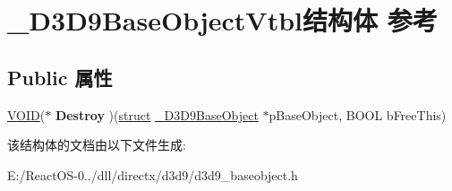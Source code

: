 \hypertarget{struct___d3_d9_base_object_vtbl}{}\section{\+\_\+\+D3\+D9\+Base\+Object\+Vtbl结构体 参考}
\label{struct___d3_d9_base_object_vtbl}
\subsection*{Public 属性}
\begin{DoxyCompactItemize}
\item 
\mbox{\label{struct___d3_d9_base_object_vtbl_a373ad3f5142ca0a7525a47ff6981341d}} 
\hyperlink{interfacevoid}{V\+O\+ID}($\ast$ {\bfseries Destroy} )(\hyperlink{interfacestruct}{struct} \hyperlink{struct___d3_d9_base_object}{\+\_\+\+D3\+D9\+Base\+Object} $\ast$p\+Base\+Object, B\+O\+OL b\+Free\+This)
\end{DoxyCompactItemize}


该结构体的文档由以下文件生成\+:\begin{DoxyCompactItemize}
\item 
E\+:/\+React\+O\+S-\/0../dll/directx/d3d9/d3d9\+\_\+baseobject.\+h\end{DoxyCompactItemize}
